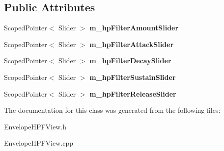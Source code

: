 \subsection*{Public Attributes}
\begin{DoxyCompactItemize}
\item 
Scoped\+Pointer$<$ Slider $>$ {\bfseries m\+\_\+hp\+Filter\+Amount\+Slider}\hypertarget{class_envelope_h_p_filter_view_a837b2ca7f86eeed3a2c05de582be9011}{}\label{class_envelope_h_p_filter_view_a837b2ca7f86eeed3a2c05de582be9011}

\item 
Scoped\+Pointer$<$ Slider $>$ {\bfseries m\+\_\+hp\+Filter\+Attack\+Slider}\hypertarget{class_envelope_h_p_filter_view_a56ac45353393ad2097594ea85b903021}{}\label{class_envelope_h_p_filter_view_a56ac45353393ad2097594ea85b903021}

\item 
Scoped\+Pointer$<$ Slider $>$ {\bfseries m\+\_\+hp\+Filter\+Decay\+Slider}\hypertarget{class_envelope_h_p_filter_view_ac31dd9903eadc0f184ad6a541617d47b}{}\label{class_envelope_h_p_filter_view_ac31dd9903eadc0f184ad6a541617d47b}

\item 
Scoped\+Pointer$<$ Slider $>$ {\bfseries m\+\_\+hp\+Filter\+Sustain\+Slider}\hypertarget{class_envelope_h_p_filter_view_a4156bcfa5ffc8e203c897efc6e30ec69}{}\label{class_envelope_h_p_filter_view_a4156bcfa5ffc8e203c897efc6e30ec69}

\item 
Scoped\+Pointer$<$ Slider $>$ {\bfseries m\+\_\+hp\+Filter\+Release\+Slider}\hypertarget{class_envelope_h_p_filter_view_adf459aee7da0884fda7fe0d08d8e982f}{}\label{class_envelope_h_p_filter_view_adf459aee7da0884fda7fe0d08d8e982f}

\end{DoxyCompactItemize}


The documentation for this class was generated from the following files\+:\begin{DoxyCompactItemize}
\item 
Envelope\+H\+P\+F\+View.\+h\item 
Envelope\+H\+P\+F\+View.\+cpp\end{DoxyCompactItemize}
